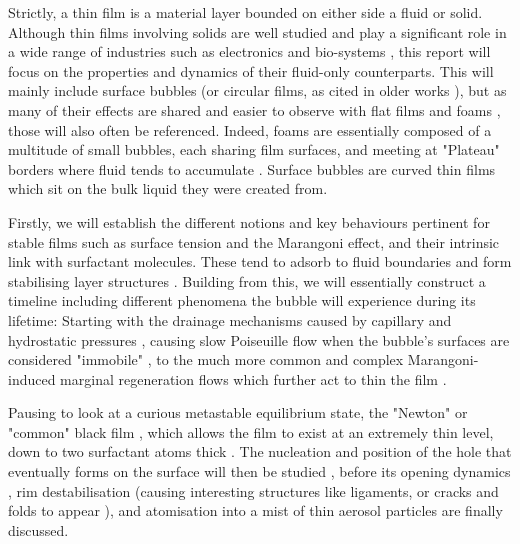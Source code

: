 \documentclass[a4paper,12pt]{article}
\numberwithin{equation}{section}
\numberwithin{figure}{section}
\numberwithin{table}{section}
\begin{document}
Strictly, a thin film is a material layer bounded on either side a fluid or solid. Although thin films involving solids are well studied and play a significant role in a wide range of industries such as electronics and bio-systems \cite{SolidThinFilms}, this report will focus on the properties and dynamics of their fluid-only counterparts. This will mainly include surface bubbles (or circular films, as cited in older works \cite{Vrij1968, VrijDiscussion1966}), but as many of their effects are shared and easier to observe with flat films and foams \cite{Braun2002}, those will also often be referenced. Indeed, foams are essentially composed of a multitude of small bubbles, each sharing film surfaces, and meeting at "Plateau" borders where fluid tends to accumulate \cite{Almgren1976}. Surface bubbles are curved thin films which sit on the bulk liquid they were created from. %

Firstly, we will establish the different notions and key behaviours pertinent for stable films such as surface tension and the Marangoni effect, and their intrinsic link with surfactant molecules. These tend to adsorb to fluid boundaries \cite{Gast1997} and form stabilising layer structures \cite{Mysels1968Nomenclature}. Building from this, we will essentially construct a timeline including different phenomena the bubble will experience during its lifetime: Starting with the drainage mechanisms caused by capillary and hydrostatic pressures \cite{Lhuissier2011}, causing slow Poiseuille flow when the bubble's surfaces are considered "immobile" \cite{Nierstrasz1999, Bruinsma1995, Modini2013}, to the much more common and complex Marangoni-induced marginal regeneration flows which further act to thin the film \cite{Mysels1959Book, Bhamla2017, Bruinsma1995}.

Pausing to look at a curious metastable equilibrium state, the "Newton" or "common" black film \cite{Seung2006}, which allows the film to exist at an extremely thin level, down to two surfactant atoms thick \cite{Casteletto2003}. The nucleation and position of the hole that eventually forms on the surface will then be studied \cite{ChampougnyNotBare2016, Debregeas1998}, before its opening dynamics \cite{Culick1960}, rim destabilisation (causing interesting structures like ligaments, or cracks and folds to appear \cite{Bico2015, Lhuissier2009}), and atomisation into a mist of thin aerosol particles \cite{Modini2013} are finally discussed.
\end{document}
